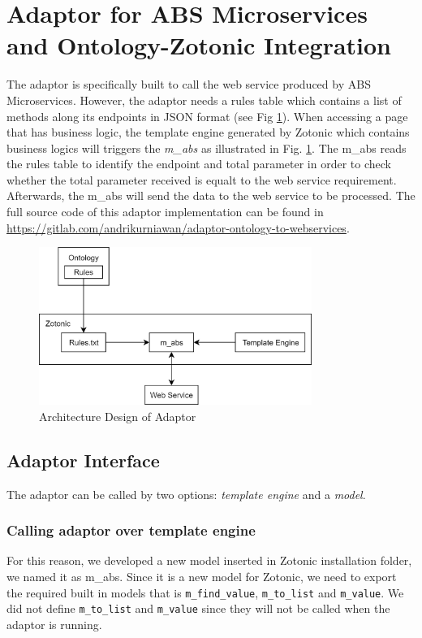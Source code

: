 \documentclass[conference]{IEEEtran}
\begin{document}
\section{Adaptor for ABS Microservices and Ontology-Zotonic Integration} \label{adaptor}
The adaptor is specifically built to call the web service produced by ABS Microservices. However, the adaptor needs a rules table which contains a list of methods along its endpoints in JSON format (see Fig \ref{fig_design}). When accessing a page that has business logic, the template engine generated by Zotonic which contains business logics will triggers the \textit{m\_abs} as illustrated in Fig. \ref{fig_design}. The m\_abs reads the rules table to identify the endpoint and total parameter in order to check whether the total parameter received is equalt to the web service requirement. Afterwards, the m\_abs will send the data to the web service to be processed. The full source code of this adaptor implementation can be found in \url{https://gitlab.com/andrikurniawan/adaptor-ontology-to-webservices}.

\begin{figure}[h]
\centering
\includegraphics[width=3.5in]{adaptordesign}

\caption{Architecture Design of Adaptor}
\label{fig_design}
\end{figure}

%

\subsection{Adaptor Interface}
The adaptor can be called by two options: \textit{template engine} and a \textit{model}. 

\subsubsection{Calling adaptor over template engine}
For this reason, we developed a new model inserted in Zotonic installation folder, we named it as m\_abs. Since it is a new model for Zotonic, we need to export the required built in models that is \texttt{m\_find\_value}, \texttt{m\_to\_list} and \texttt{m\_value}. We did not define \texttt{m\_to\_list} and \texttt{m\_value} since they will not be called when the adaptor is running.
\end{document}
